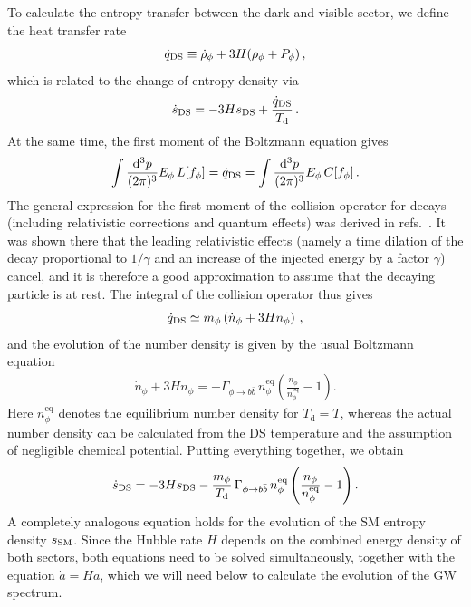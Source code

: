 To calculate the entropy transfer between the dark and visible sector, we define the heat transfer rate
\begin{align}
	\dot{q}_{\text{DS}} \equiv \dot{\rho}_\phi + 3 H (\rho_\phi + P_\phi) \,,
\end{align}
which is related to the change of entropy density via
\begin{align}
	\dot{s}_{\text{DS}} = -3  H  s_{\text{DS}} + \frac{\dot{q}_{\text{DS}}}{T_\text{d}} \,.
\end{align}
At the same time, the first moment of the Boltzmann equation gives
\begin{align}
	\int \frac{\mathrm{d}^3 p}{(2\pi)^3} E_\phi \, L[f_\phi] = \dot{q}_{\text{DS}} =  \int \frac{\mathrm{d}^3 p}{(2\pi)^3} E_\phi \, C[f_\phi] \, .
\end{align}
The general expression for the first moment of the collision operator for decays (including relativistic corrections and quantum effects)
was derived in refs.~\cite{Bringmann:2021sth, Bernreuther:2022bdw}. It was shown there that the leading relativistic effects (namely a time dilation of the decay proportional to $1/\gamma$ and an increase of the injected energy by a factor $\gamma$) cancel, and it is therefore a good approximation to assume that the decaying particle is at rest. The integral of the collision operator thus gives
\begin{align}
	\dot{q}_{\text{DS}} \simeq m_\phi \left(\dot{n}_\phi + 3 H n_\phi\right) \,,
\end{align}
and the evolution of the number density is given by the usual Boltzmann equation
\begin{align}
	\dot{n}_\phi + 3  H  n_\phi = - \Gamma_{\phi \to b \bar{b}}  \, n^\text{eq}_\phi \left(\frac{n_\phi}{n^\text{eq}_\phi} - 1 \right) .
\end{align}
Here $n^\text{eq}_\phi$ denotes the equilibrium number density for $T_\text{d}= T$, whereas the actual number density can be calculated from the \ac{DS} temperature and the assumption of negligible chemical potential.  Putting everything together, we obtain
\begin{align}
	\dot{s}_{\text{DS}} = - 3 H  s_{\text{DS}} - \frac{m_\phi}{T_\mathrm{d}} \, \Gamma_{\phi \to b \bar{b}} \, n^\text{eq}_\phi
	\left( \frac{n_\phi}{n^\text{eq}_\phi} - 1 \right).
\end{align}
A completely analogous equation holds for the evolution of the \ac{SM} entropy density $s_{\text{SM}}$. Since the Hubble rate $H$ depends on the combined energy density of both sectors, both equations need to be solved simultaneously, together with the equation $\dot{a} = H a$, which we will need below to calculate the evolution of the \ac{GW} spectrum.

